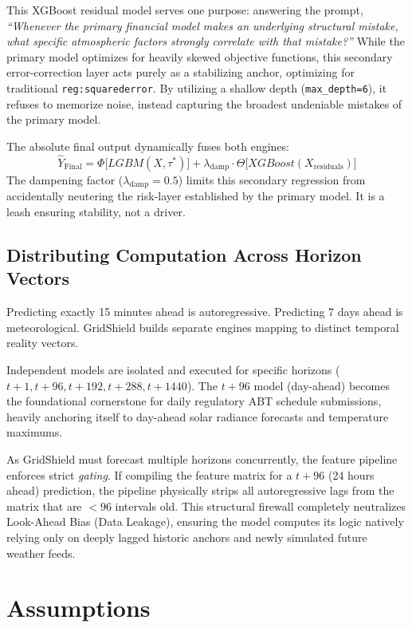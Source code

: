 \documentclass[11pt,a4paper]{article}
\begin{document}
This XGBoost residual model serves one purpose: answering the prompt, \textit{``Whenever the primary financial model makes an underlying structural mistake, what specific atmospheric factors strongly correlate with that mistake?''} While the primary model optimizes for heavily skewed objective functions, this secondary error-correction layer acts purely as a stabilizing anchor, optimizing for traditional \texttt{reg:squarederror}. By utilizing a shallow depth (\texttt{max\_depth=6}), it refuses to memorize noise, instead capturing the broadest undeniable mistakes of the primary model.

The absolute final output dynamically fuses both engines:
\begin{equation}
\hat{Y}_{\text{Final}} = \Phi\Big[LGBM(X, \tau^*)\Big] + \lambda_{\text{damp}} \cdot \Theta\Big[XGBoost(X_{\text{residuals}})\Big]
\end{equation}
The dampening factor ($\lambda_{\text{damp}} = 0.5$) limits this secondary regression from accidentally neutering the risk-layer established by the primary model. It is a leash ensuring stability, not a driver.

\subsection{Distributing Computation Across Horizon Vectors}
Predicting exactly 15 minutes ahead is autoregressive. Predicting 7 days ahead is meteorological. GridShield builds separate engines mapping to distinct temporal reality vectors.

Independent models are isolated and executed for specific horizons ($t+1, t+96, t+192, t+288, t+1440$). The $t+96$ model (day-ahead) becomes the foundational cornerstone for daily regulatory ABT schedule submissions, heavily anchoring itself to day-ahead solar radiance forecasts and temperature maximums.

As GridShield must forecast multiple horizons concurrently, the feature pipeline enforces strict \textit{gating}. If compiling the feature matrix for a $t+96$ (24 hours ahead) prediction, the pipeline physically strips all autoregressive lags from the matrix that are $<96$ intervals old. This structural firewall completely neutralizes Look-Ahead Bias (Data Leakage), ensuring the model computes its logic natively relying only on deeply lagged historic anchors and newly simulated future weather feeds.

\section{Assumptions}
\end{document}
